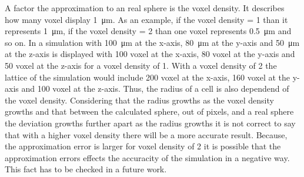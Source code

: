 A factor the approximation to an real sphere is the voxel density. It describes how many voxel display \SI{1}{\micro\metre}. As an example, if the voxel density = 1 than it represents \SI{1}{\micro\metre}, if the voxel density = 2 than one voxel represents \SI{0.5}{\micro\metre} and so on. In a simulation with \SI{100}{\micro\metre} at the x-axis, \SI{80}{\micro\metre} at the y-axis and \SI{50}{\micro\metre} at the z-axis is displayed with 100 voxel at the x-axis, 80 voxel at the y-axis and 50 voxel at the z-axis for a voxel density of 1. With a voxel density of 2 the lattice of the simulation would include 200 voxel at the x-axis, 160 voxel at the y-axis and 100 voxel at the z-axis. Thus, the radius of a cell is also dependend of the voxel density. Considering that the radius growths as the voxel density growths and that between the calculated sphere, out of pixels, and a real sphere the deviation growths further apart as the radius growths it is not correct to say that with a higher voxel density there will be a more accurate result. Because, the approximation error is larger for voxel density of 2 it is possible that the approximation errors effects the accuracity of the simulation in a negative way. This fact has to be checked in a future work.